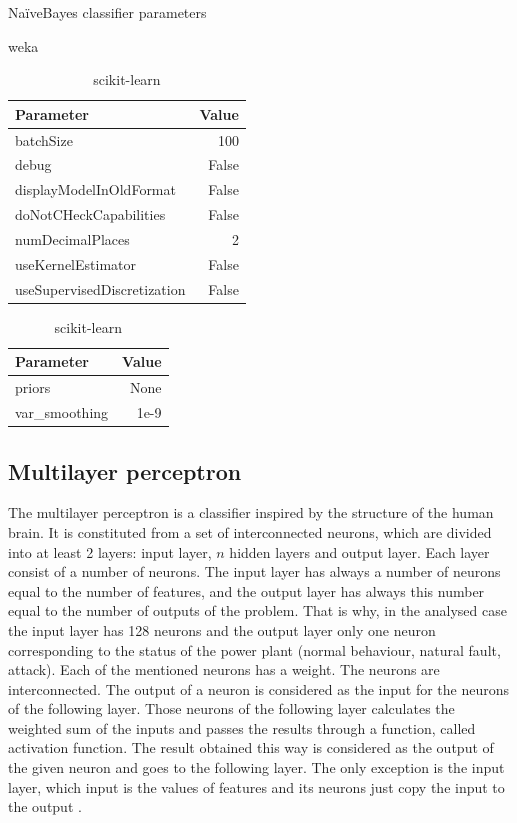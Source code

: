 \begin{table}[H]
    \footnotesize
    \centering
    \caption{NaïveBayes classifier parameters} \label{tab:nb_param}
    \begin{subtable}[t]{0.5\linewidth}
        \caption{weka \cite{noauthor_naivebayes_nodate}}
        \centering
        \begin{tabular}{lr}\toprule
            Parameter & Value \\\midrule
            batchSize & 100 \\
            debug & False \\
            displayModelInOldFormat & False \\
            doNotCHeckCapabilities & False \\
            numDecimalPlaces & 2 \\
            useKernelEstimator & False \\
            useSupervisedDiscretization & False\\\bottomrule
        \end{tabular}
    \end{subtable}%
    \begin{subtable}[t]{.5\linewidth}
        \caption{scikit-learn \cite{noauthor_sklearnnaive_bayesgaussiannb_nodate}}
        \centering
        \begin{tabular}{lr}\toprule
            Parameter & Value \\\midrule
            priors & None \\
            var\_smoothing & 1e-9 \\\bottomrule
        \end{tabular}
    \end{subtable}%
\end{table}

\subsection{Multilayer perceptron}
The multilayer perceptron is a classifier inspired by the structure of the human brain. It is constituted from a set of interconnected neurons, which are divided into at least 2 layers: input layer, $n$ hidden layers and output layer. Each layer consist of a number of neurons. The input layer has always a number of neurons equal to the number of features, and the output layer has always this number equal to the number of outputs of the problem. That is why, in the analysed case the input layer has 128 neurons and the output layer only one neuron corresponding to the status of the power plant (normal behaviour, natural fault, attack). Each of the mentioned neurons has a weight. The neurons are interconnected. The output of a neuron is considered as the input for the neurons of the following layer. Those neurons of the following layer calculates the weighted sum of the inputs and passes the results through a function, called activation function. The result obtained this way is considered as the output of the given neuron and goes to the following layer. The only exception is the input layer, which input is the values of features and its neurons just copy the input to the output \cite{patel_implementing_2020} \cite{noauthor_neural_nodate} \cite{stokfiszewski_soft_nodate}.

